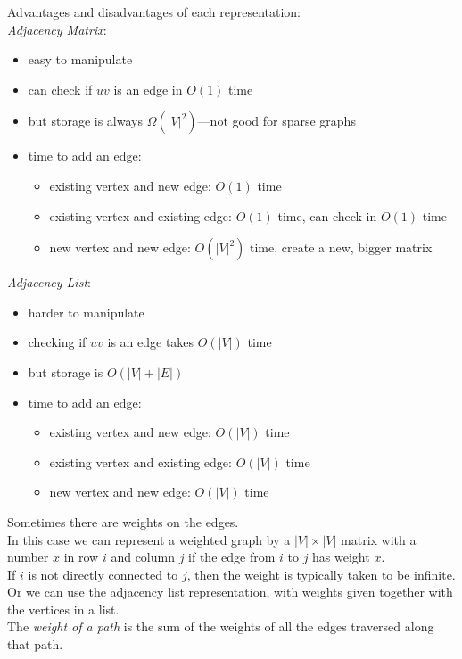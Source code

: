 \documentclass[12pt]{article}
\theoremstyle{plain}
\theoremstyle{definition}
\begin{document}
Advantages and disadvantages of each representation: \\
\emph{Adjacency Matrix}:
\begin{itemize}
  \item easy to manipulate
  \item can check if $uv$ is an edge in $O(1)$ time
  \item but storage is always $\Omega(|V|^{2})$---not good for sparse graphs
  \item time to add an edge:
  \begin{itemize}
    \item existing vertex and new edge: $O(1)$ time
    \item existing vertex and existing edge: $O(1)$ time, can check in $O(1)$ time
    \item new vertex and new edge: $O(|V|^{2})$ time, create a new, bigger matrix
  \end{itemize}
\end{itemize}

\emph{Adjacency List}:
\begin{itemize}
  \item harder to manipulate
  \item checking if $uv$ is an edge takes $O(|V|)$ time
  \item but storage is $O(|V| + |E|)$
  \item time to add an edge:
  \begin{itemize}
    \item existing vertex and new edge: $O(|V|)$ time
    \item existing vertex and existing edge: $O(|V|)$ time
    \item new vertex and new edge: $O(|V|)$ time
  \end{itemize}
\end{itemize}

Sometimes there are weights on the edges. \\
In this case we can represent a weighted graph by a $|V| \times |V|$ matrix with a number $x$ in row $i$ and column $j$ if the edge from $i$ to $j$ has weight $x$. \\
If $i$ is not directly connected to $j$, then the weight is typically taken to be infinite. \\
Or we can use the adjacency list representation, with weights given together with the vertices in a list. \\

The \emph{weight of a path} is the sum of the weights of all the edges traversed along that path.
\end{document}
